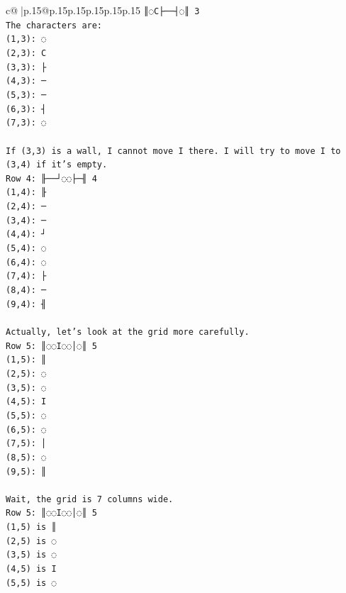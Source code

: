 \documentclass{article}
\begin{document}
{\begin{supertabular}{c@{$\;$}|p{.15\linewidth}@{}p{.15\linewidth}p{.15\linewidth}p{.15\linewidth}p{.15\linewidth}p{.15\linewidth}}
{{{\texttt{║◌C├──┤◌║ 3} \\
\texttt{The characters are:} \\
\texttt{(1,3): ◌} \\
\texttt{(2,3): C} \\
\texttt{(3,3): ├} \\
\texttt{(4,3): ─} \\
\texttt{(5,3): ─} \\
\texttt{(6,3): ┤} \\
\texttt{(7,3): ◌} \\
\\ 
\texttt{If (3,3) is a wall, I cannot move I there. I will try to move I to (3,4) if it's empty.} \\
\texttt{Row 4: ╟──┘◌◌├─╢ 4} \\
\texttt{(1,4): ╟} \\
\texttt{(2,4): ─} \\
\texttt{(3,4): ─} \\
\texttt{(4,4): ┘} \\
\texttt{(5,4): ◌} \\
\texttt{(6,4): ◌} \\
\texttt{(7,4): ├} \\
\texttt{(8,4): ─} \\
\texttt{(9,4): ╢} \\
\\ 
\texttt{Actually, let's look at the grid more carefully.} \\
\texttt{Row 5: ║◌◌I◌◌│◌║ 5} \\
\texttt{(1,5): ║} \\
\texttt{(2,5): ◌} \\
\texttt{(3,5): ◌} \\
\texttt{(4,5): I} \\
\texttt{(5,5): ◌} \\
\texttt{(6,5): ◌} \\
\texttt{(7,5): │} \\
\texttt{(8,5): ◌} \\
\texttt{(9,5): ║} \\
\\ 
\texttt{Wait, the grid is 7 columns wide.} \\
\texttt{Row 5: ║◌◌I◌◌│◌║ 5} \\
\texttt{(1,5) is ║} \\
\texttt{(2,5) is ◌} \\
\texttt{(3,5) is ◌} \\
\texttt{(4,5) is I} \\
\texttt{(5,5) is ◌} \\
}}}
\end{supertabular}}
\end{document}
